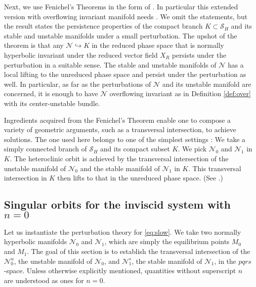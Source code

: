 \documentclass[a4paper,11pt]{article}
\theoremstyle{remark}
\begin{document}
Next, we use Fenichel's Theorems in the form of \cite[Theorem 2.2]{Sz1991}. In particular this extended version with overflowing invariant manifold needs \cite[Theorem 3]{fenichel_asymptotic_1977}. %
We omit the statements, but the result states the persistence properties of the compact branch $K\subset\mathcal{S}_H$ and its stable and unstable manifolds under a small perturbation. The upshot of the theorem is that any $\mathcal{N}\hookrightarrow K$ in the reduced phase space that is normally hyperbolic invariant under the reduced vector field $X_R$ persists under the perturbation in a suitable sense. The stable and unstable manifolds of $\mathcal{N}$ has a local lifting to the unreduced phase space and persist under the perturbation as well. In particular, as far as the perturbations of $\mathcal{N}$ and its unstable manifold are concerned, it is enough to have $\mathcal{N}$ overflowing invariant as in Definition \ref{def:over} with its center-unstable bundle.

Ingredients acquired from the Fenichel's Theorem enable one to compose a variety of geometric arguments, such as a transversal intersection, to achieve solutions. The one used here belongs to one of the simplest settings \cite[Theorem 3.1]{Sz1991}: We take a simply connected branch of  $\mathcal{S}_H$ and its compact subset $K$. We pick $\mathcal{N}_0$ and $\mathcal{N}_1$ in $K$. The heteroclinic orbit is achieved by the transversal intersection of the unstable manifold of $\mathcal{N}_0$ and the stable manifold of $\mathcal{N}_1$ in $K$. This transversal intersection in $K$ then lifts to that in the unreduced phase space. (See \cite{Sz1991}.) %

\subsection{Singular orbits for the inviscid system with $n=0$}\label{sec:singorb}

Let us instantiate the perturbation theory for \eqref{eq:slow}. We take two normally hyperbolic manifolds %
$\mathcal{N}_0$ and $\mathcal{N}_1$, which are simply the equilibrium points $M_0$ and $M_1$. The goal of this section is to establish the transversal intersection of the $\mathcal{N}_0^u$, the unstable manifold of $\mathcal{N}_0$, and $\mathcal{N}^s_1$, the stable manifold of $\mathcal{N}_1$, in the $pqrs$-space. Unless otherwise explicitly mentioned, quantities without superscript $n$ are understood as ones for $n=0$. %
\end{document}
